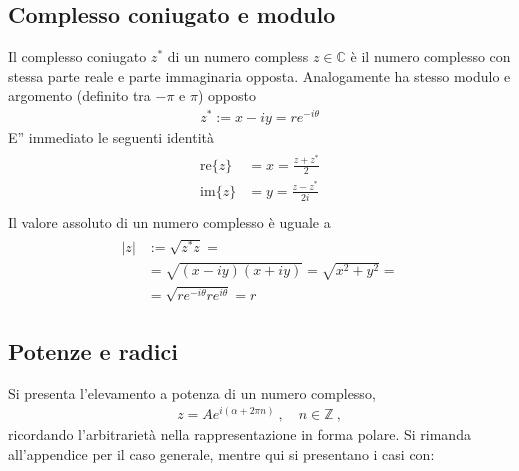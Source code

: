 \documentclass[letterpaper,10pt,italian]{jupyterBook}
\begin{document}
\subsection{Complesso coniugato e modulo}
\label{\detokenize{ch/algebra/complex-algebra:complesso-coniugato-e-modulo}}
\sphinxAtStartPar
{} Il complesso coniugato \(z^*\) di un numero compless \(z \in \mathbb{C}\) è il numero complesso con stessa parte reale e parte immaginaria opposta. Analogamente ha stesso modulo e argomento (definito tra \(-\pi\) e \(\pi\)) opposto
\begin{equation*}
\begin{split}z^* := x - i y = r e^{-i\theta} \end{split}
\end{equation*}
\sphinxAtStartPar
E” immediato {\hyperref[\detokenize{ch/algebra/complex-algebra-problems:math-hs-algebra-complex-problems-operations-cc-re-im}]{}} le seguenti identità
\begin{equation}\label{equation:ch/algebra/complex-algebra:complex:cc:re-im}
\begin{split}\begin{aligned}
  \text{re}\{ z \} & = x = \frac{z + z^*}{2} \\
  \text{im}\{ z \} & = y = \frac{z - z^*}{2i} \\
\end{aligned}\end{split}
\end{equation}
\sphinxAtStartPar
{} Il valore assoluto di un numero complesso è uguale a
\begin{equation*}
\begin{split}\begin{aligned}
    |z| & := \sqrt{z^* z} = \\
    & = \sqrt{(x-iy)(x+iy)} =  \sqrt{x^2 + y^2} = \\
    & = \sqrt{r e^{-i\theta} r e^{i\theta}} = r
  \end{aligned}\end{split}
\end{equation*}

\subsection{Potenze e radici}
\label{\detokenize{ch/algebra/complex-algebra:potenze-e-radici}}
\sphinxAtStartPar
{} Si presenta l’elevamento a potenza di un numero complesso,
\begin{equation*}
\begin{split}z = A e^{i (\alpha + 2 \pi n)} \ , \quad n \in \mathbb{Z} \ ,\end{split}
\end{equation*}
\sphinxAtStartPar
ricordando l’arbitrarietà nella rappresentazione in forma polare. Si rimanda all’appendice per il caso generale, mentre qui si presentano i casi con:
\end{document}
